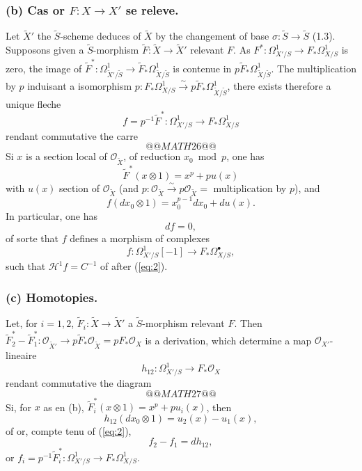 \documentclass[12pt,a4paper]{article}
\theoremstyle{plain}
\theoremstyle{definition}
\theoremstyle{remark}
\newcommand{\cO}{\mathcal{O}}
\begin{document}
\subsubsection*{(b) Cas or $F: X \to X'$ se releve.}

Let $\tilde{X}'$ the $\tilde{S}$-scheme deduces of $\tilde{X}$ by the changement of base $\sigma: \tilde{S} \to \tilde{S}$ (1.3). Supposons given a $\tilde{S}$-morphism $\tilde{F}: \tilde{X} \to \tilde{X}'$ relevant $F$. As $F^*: \Omega^1_{X'/S} \to F_* \Omega^1_{X/S}$ is zero, the image of $\tilde{F}^*: \Omega^1_{\tilde{X}'/\tilde{S}} \to \tilde{F}_* \Omega^1_{\tilde{X}/\tilde{S}}$ is contenue in $p\tilde{F}_* \Omega^1_{\tilde{X}/\tilde{S}}$. The multiplication by $p$ induisant a isomorphism $p: F_* \Omega^1_{X/S} \xrightarrow{\sim} p\tilde{F}_* \Omega^1_{\tilde{X}/\tilde{S}}$, there exists therefore a unique fleche
\[
f = p^{-1}\tilde{F}^*: \Omega^1_{X'/S} \to F_* \Omega^1_{X/S}
\]
rendant commutative the carre
\[
@@MATH26@@
\]
Si $x$ is a section local of $\cO_{\tilde{X}}$, of reduction $x_0 \bmod p$, one has
\begin{equation}\label{eq:1}
\tilde{F}^*(x \otimes 1) = x^p + p u(x)
\end{equation}
with $u(x)$ section of $\cO_{\tilde{X}}$ (and $p: \cO_{\tilde{X}} \xrightarrow{\sim} p\cO_{\tilde{X}} =$ multiplication by $p$), and
\begin{equation}\label{eq:2}
f(dx_0 \otimes 1) = x_0^{p-1} dx_0 + du(x).
\end{equation}
In particular, one has
\begin{equation}\label{eq:3}
df = 0,
\end{equation}
of sorte that $f$ defines a morphism of complexes
\[
f: \Omega^1_{X'/S}[-1] \to F_* \Omega^{\bullet}_{X/S},
\]
such that $\mathscr{H}^1 f = C^{-1}$ of after (\ref{eq:2}).

\subsubsection*{(c) Homotopies.}

Let, for $i = 1, 2$, $\tilde{F}_i: \tilde{X} \to \tilde{X}'$ a $\tilde{S}$-morphism relevant $F$. Then $\tilde{F}_2^* - \tilde{F}_1^*: \cO_{\tilde{X}'} \to p\tilde{F}_* \cO_{\tilde{X}} = pF_* \cO_X$ is a derivation, which determine a map $\cO_{X'}$-lineaire
\[
h_{12}: \Omega^1_{X'/S} \to F_* \cO_X
\]
rendant commutative the diagram
\[
@@MATH27@@
\]
Si, for $x$ as en (b), $\tilde{F}_i^*(x \otimes 1) = x^p + p u_i(x)$, then
\[
h_{12}(dx_0 \otimes 1) = u_2(x) - u_1(x),
\]
of or, compte tenu of (\ref{eq:2}),
\begin{equation}\label{eq:4}
f_2 - f_1 = dh_{12},
\end{equation}
or $f_i = p^{-1}\tilde{F}_i^*: \Omega^1_{X'/S} \to F_* \Omega^1_{X/S}$.
\end{document}
